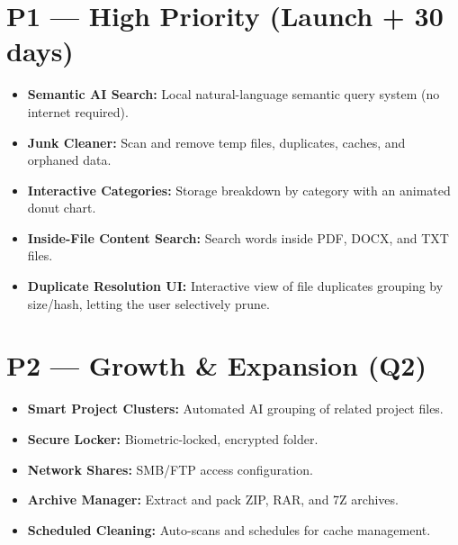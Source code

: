 \section{P1 --- High Priority (Launch + 30 days)}
\begin{itemize}
  \item \textbf{Semantic AI Search:} Local natural-language semantic query system (no internet required).
  \item \textbf{Junk Cleaner:} Scan and remove temp files, duplicates, caches, and orphaned data.
  \item \textbf{Interactive Categories:} Storage breakdown by category with an animated donut chart.
  \item \textbf{Inside-File Content Search:} Search words inside PDF, DOCX, and TXT files.
  \item \textbf{Duplicate Resolution UI:} Interactive view of file duplicates grouping by size/hash, letting the user selectively prune.
\end{itemize}

\section{P2 --- Growth \& Expansion (Q2)}
\begin{itemize}
  \item \textbf{Smart Project Clusters:} Automated AI grouping of related project files.
  \item \textbf{Secure Locker:} Biometric-locked, encrypted folder.
  \item \textbf{Network Shares:} SMB/FTP access configuration.
  \item \textbf{Archive Manager:} Extract and pack ZIP, RAR, and 7Z archives.
  \item \textbf{Scheduled Cleaning:} Auto-scans and schedules for cache management.
\end{itemize}
